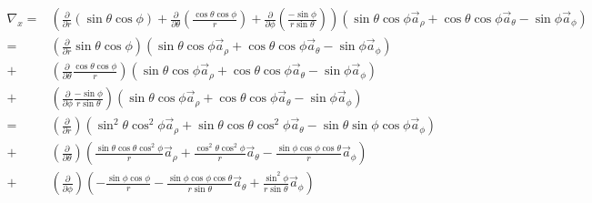                 \begin{align*}
                    \nabla_x = & \left(\frac{\partial}{\partial r}\left(\sin\theta\cos\phi\right) 
                                + \frac{\partial}{\partial \theta}\left(\frac{\cos\theta\cos\phi}{r}\right)
                                + \frac{\partial}{\partial \phi}\left(\frac{-\sin\phi}{r\sin\theta}\right)\right)
                                \left(\sin\theta\cos\phi\vec{a}_\rho + \cos\theta\cos\phi\vec{a}_\theta - \sin\phi\vec{a}_\phi\right) \\
                            = & \left(\frac{\partial}{\partial r}\sin\theta\cos\phi\right)
                                \left(\sin\theta\cos\phi\vec{a}_\rho + \cos\theta\cos\phi\vec{a}_\theta - \sin\phi\vec{a}_\phi\right) \\
                            + & \left(\frac{\partial}{\partial \theta}\frac{\cos\theta\cos\phi}{r}\right)
                                \left(\sin\theta\cos\phi\vec{a}_\rho + \cos\theta\cos\phi\vec{a}_\theta - \sin\phi\vec{a}_\phi\right) \\
                            + & \left(\frac{\partial}{\partial \phi}\frac{-\sin\phi}{r\sin\theta}\right)
                                \left(\sin\theta\cos\phi\vec{a}_\rho + \cos\theta\cos\phi\vec{a}_\theta - \sin\phi\vec{a}_\phi\right) \\
                            = & \left(\frac{\partial}{\partial r}\right)\left(
                                    \sin^2\theta\cos^2\phi\vec{a}_\rho + 
                                    \sin\theta\cos\theta\cos^2\phi\vec{a}_\theta -
                                    \sin\theta\sin\phi\cos\phi\vec{a}_\phi
                                \right) \\
                            + & \left(\frac{\partial}{\partial\theta}\right)\left(
                                    \frac{\sin\theta\cos\theta\cos^2\phi}{r}\vec{a}_\rho + 
                                    \frac{\cos^2\theta\cos^2\phi}{r}\vec{a}_\theta -
                                    \frac{\sin\phi\cos\phi\cos\theta}{r}\vec{a}_\phi
                                \right)\\
                            + & \left(\frac{\partial}{\partial\phi}\right)\left(
                                    -\frac{\sin\phi\cos\phi}{r}
                                    -\frac{\sin\phi\cos\phi\cos\theta}{r\sin\theta}\vec{a}_\theta 
                                    +\frac{\sin^2{\phi}}{r\sin\theta}\vec{a}_\phi
                                \right)
                \end{align*}
